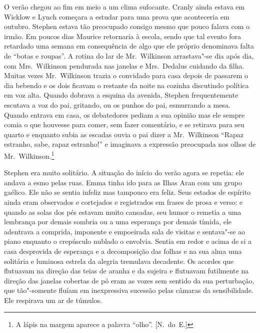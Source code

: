 O verão chegou ao fim em meio a um clima sufocante.  Cranly ainda estava em
Wicklow e Lynch começara a estudar para uma prova que aconteceria em outubro.
Stephen estava tão preocupado consigo mesmo que pouco falava com o irmão.  Em
poucos dias Maurice retornaria à escola, sendo que tal evento fora retardado
uma semana em consequência de algo que ele próprio denominava falta de “botas
e roupas”.  A rotina do lar de Mr.~Wilkinson arrastava"-se dia após dia, com
Mrs.~Wilkinson pendurada nas janelas e Mrs.~Dedalus cuidando da filha.
Muitas vezes Mr.~Wilkinson trazia o convidado para casa depois de passarem o
dia bebendo e os dois ficavam o restante da noite na cozinha discutindo
política em voz alta.  Quando dobrava a esquina da avenida, Stephen
frequentemente escutava a voz do pai, gritando, ou os punhos do pai, esmurrando
a mesa.  Quando entrava em casa, os debatedores pediam a sua opinião mas ele
sempre comia o que houvesse para comer, sem fazer comentário, e se
retirava para seu quarto e enquanto subia as escadas ouvia o pai dizer a 
Mr.~Wilkinson “Rapaz estranho, sabe, rapaz estranho!” e imaginava a expressão
preocupada nos olhos de Mr.~Wilkinson.\footnote{ A lápis na margem aparece a
palavra “olho”. [N.~do~E.]}

Stephen era muito solitário.  A situação do início do verão agora se repetia:
ele andava a esmo pelas ruas.  Emma tinha ido para as Ilhas Aran com um grupo
gaélico.  Ele não se sentia infeliz mas tampouco era feliz.  Seus estados de
espírito ainda eram observados e cortejados e registrados em frases de prosa e
verso: e quando as solas dos pés estavam muito cansadas, seu humor o
remetia a uma lembrança \label{por"-demais} por demais sombria ou a uma esperança por demais
tímida, ele adentrava a comprida, imponente e empoeirada sala de visitas e
sentava"-se ao piano \label{enquanto"-o} enquanto o crepúsculo nublado o envolvia.  Sentia em
redor e acima de si a casa desprovida de esperança e a decomposição das folhas
e na sua alma uma solitária e luminosa estrela da alegria tremulava decadente.
Os acordes que flutuavam na direção das teias de aranha e da sujeira e
flutuavam futilmente na direção das janelas cobertas de pó eram as vozes sem
sentido da sua perturbação, que tão"-somente fluíam em inexpressiva sucessão
pelas câmaras da sensibilidade.  Ele respirava um ar de túmulos.

